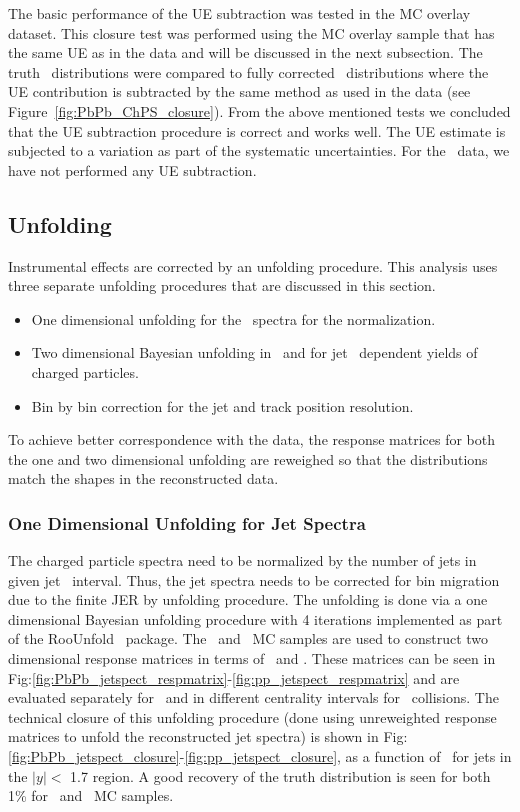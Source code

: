 The basic performance of the UE subtraction was tested in the MC overlay dataset.
This closure test was performed using the MC overlay sample that has the same UE as in the data and will be discussed in the next subsection.
The truth \Rdptr\ distributions were compared to fully corrected \Rdptr\ distributions where the UE contribution is subtracted by the same method as used in the data (see Figure~\ref{fig:PbPb_ChPS_closure}).
From the above mentioned tests we concluded that the UE subtraction procedure is correct and works well.
The UE estimate is subjected to a variation as part of the systematic uncertainties.
For the \pp\ data, we have not performed any UE subtraction.



\subsection{Unfolding}
\label{sec:unfolding}

Instrumental effects are corrected by an unfolding procedure.
This analysis uses three separate unfolding procedures that are discussed in this section.

\begin{itemize}
\item One dimensional unfolding for the \ptjet\ spectra for the normalization.
\item Two dimensional Bayesian unfolding in \pttrk\ and \ptjet for jet \pt\ dependent yields of charged particles.
\item Bin by bin correction for the jet and track position resolution.
\end{itemize}

To achieve better correspondence with the data, the response matrices for both the one and two dimensional unfolding are reweighed so that the distributions match the shapes in the reconstructed data.

\subsubsection{One Dimensional Unfolding for Jet Spectra}
\label{sec:1dunfolding}
The charged particle spectra need to be normalized by the number of jets in given jet \pt\ interval.
Thus, the jet spectra needs to be corrected for bin migration due to the finite JER by unfolding procedure.
The unfolding is done via a one dimensional Bayesian unfolding procedure with 4 iterations implemented as part of the RooUnfold~\cite{Adye:2011gm} package.
The \pp\ and \PbPb\ MC samples are used to construct two dimensional response matrices in terms of \ptjettruth\ and \ptjetreco.
These matrices can be seen in Fig:\ref{fig:PbPb_jetspect_respmatrix}-\ref{fig:pp_jetspect_respmatrix} and are evaluated separately for \pp\ and in different centrality intervals for \PbPb\ collisions.
The technical closure of this unfolding procedure (done using unreweighted response matrices to unfold the reconstructed jet spectra) is shown in Fig:\ref{fig:PbPb_jetspect_closure}-\ref{fig:pp_jetspect_closure}, as a function of \ptjet\ for jets in the $|y| < $ 1.7 region.
A good recovery of the truth distribution is seen for both 1\% for \pbpb\ and \pp\ MC samples.

